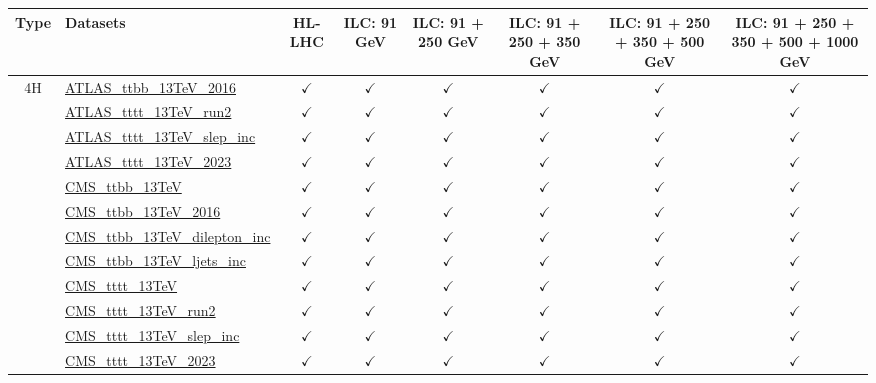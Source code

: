 \documentclass{article}
\begin{document}
\begin{longtable}{|c|l|c|c|c|c|c|c|}
\hline
\footnotesize
 Type & Datasets  & HL-LHC & ILC: 91 GeV & ILC: 91 + 250 GeV & ILC: 91 + 250 + 350 GeV & ILC: 91 + 250 + 350 + 500 GeV & ILC: 91 + 250 + 350 + 500 + 1000 GeV \\ \hline
\multirow{12}{*}{4H}
 & \href{https://arxiv.org}{ATLAS_ttbb_13TeV_2016}  & $\checkmark$ & $\checkmark$ & $\checkmark$ & $\checkmark$ & $\checkmark$ & $\checkmark$\\ \cline{2-8}
 & \href{https://arxiv.org}{ATLAS_tttt_13TeV_run2}  & $\checkmark$ & $\checkmark$ & $\checkmark$ & $\checkmark$ & $\checkmark$ & $\checkmark$\\ \cline{2-8}
 & \href{https://arxiv.org}{ATLAS_tttt_13TeV_slep_inc}  & $\checkmark$ & $\checkmark$ & $\checkmark$ & $\checkmark$ & $\checkmark$ & $\checkmark$\\ \cline{2-8}
 & \href{https://arxiv.org}{ATLAS_tttt_13TeV_2023}  & $\checkmark$ & $\checkmark$ & $\checkmark$ & $\checkmark$ & $\checkmark$ & $\checkmark$\\ \cline{2-8}
 & \href{https://arxiv.org}{CMS_ttbb_13TeV}  & $\checkmark$ & $\checkmark$ & $\checkmark$ & $\checkmark$ & $\checkmark$ & $\checkmark$\\ \cline{2-8}
 & \href{https://arxiv.org}{CMS_ttbb_13TeV_2016}  & $\checkmark$ & $\checkmark$ & $\checkmark$ & $\checkmark$ & $\checkmark$ & $\checkmark$\\ \cline{2-8}
 & \href{https://arxiv.org}{CMS_ttbb_13TeV_dilepton_inc}  & $\checkmark$ & $\checkmark$ & $\checkmark$ & $\checkmark$ & $\checkmark$ & $\checkmark$\\ \cline{2-8}
 & \href{https://arxiv.org}{CMS_ttbb_13TeV_ljets_inc}  & $\checkmark$ & $\checkmark$ & $\checkmark$ & $\checkmark$ & $\checkmark$ & $\checkmark$\\ \cline{2-8}
 & \href{https://arxiv.org}{CMS_tttt_13TeV}  & $\checkmark$ & $\checkmark$ & $\checkmark$ & $\checkmark$ & $\checkmark$ & $\checkmark$\\ \cline{2-8}
 & \href{https://arxiv.org}{CMS_tttt_13TeV_run2}  & $\checkmark$ & $\checkmark$ & $\checkmark$ & $\checkmark$ & $\checkmark$ & $\checkmark$\\ \cline{2-8}
 & \href{https://arxiv.org}{CMS_tttt_13TeV_slep_inc}  & $\checkmark$ & $\checkmark$ & $\checkmark$ & $\checkmark$ & $\checkmark$ & $\checkmark$\\ \cline{2-8}
 & \href{https://arxiv.org}{CMS_tttt_13TeV_2023}  & $\checkmark$ & $\checkmark$ & $\checkmark$ & $\checkmark$ & $\checkmark$ & $\checkmark$

\end{longtable}
\end{document}
